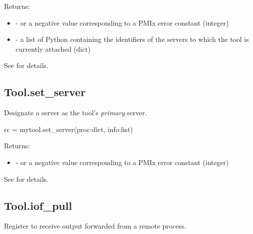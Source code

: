 Returns:

\begin{itemize}
    \item {} -  or a negative value corresponding to a PMIx error constant (integer)
    \item {} - a list of Python  containing the identifiers of the servers to which the tool is currently attached (dict)
\end{itemize}

See  for details.


\subsection{Tool.set_server}

\summary
Designate a server as the tool's \emph{primary} server.


\format

\pyspecificstart
\begin{codepar}
rc = mytool.set_server(proc:dict, info:list)
\end{codepar}
\pyspecificend

\begin{arglist}
\end{arglist}

Returns:

\begin{itemize}
    \item {} -  or a negative value corresponding to a PMIx error constant (integer)
\end{itemize}

See  for details.


\subsection{Tool.iof_pull}

\summary

Register to receive output forwarded from a remote process.

